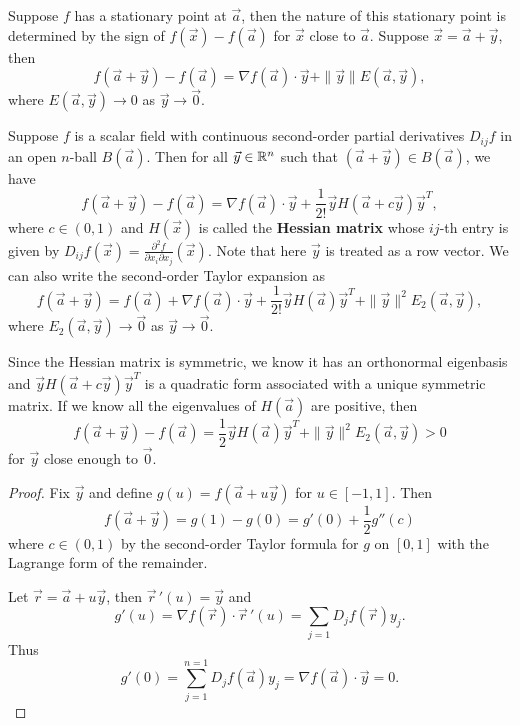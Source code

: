 \documentclass[a4paper]{ctexart}
\begin{document}
    \begin{myrmk}
        Suppose $f$ has a stationary point at $\vec a$, then the nature of this stationary point is determined by the sign of $f(\vec x) - f(\vec a)$ for $\vec x$ close to $\vec a$. Suppose $\vec x = \vec a + \vec y$, then
        $$ f(\vec a + \vec y) - f(\vec a) = \nabla f(\vec a) \cdot \vec y + \| \vec y\| E(\vec a, \vec y),$$
        where $E(\vec a, \vec y) \to 0$ as $\vec y \to \vec 0$.
    \end{myrmk}
    \begin{mythm}
        Suppose $f$ is a scalar field with continuous second-order partial derivatives $D_{ij} f$ in an open $n$-ball $B(\vec a)$. Then for all $\vec y \in \mathbb{R}^n$ such that $(\vec a + \vec y) \in B(\vec a)$, we have
        $$ 
        f(\vec a + \vec y) - f(\vec a ) = \nabla f(\vec a) \cdot \vec y + \frac{1}{2!} \vec y H(\vec a + c \vec y) \vec y^T,
        $$
        where $c\in (0,1)$ and $H(\vec x)$ is called the \textbf{Hessian matrix} whose $ij$-th entry is given by $D_{ij} f(\vec x) = \displaystyle \frac{\partial^2 f}{\partial x_i \partial x_j}(\vec x)$. Note that here $\vec y$ is treated as a row vector. We can also write the second-order Taylor expansion as
        $$
        f(\vec a + \vec y) = f(\vec a) + \nabla f(\vec a) \cdot \vec y + \frac{1}{2!} \vec y H(\vec a) \vec y^T + \| \vec y \|^2 E_2(\vec a, \vec y),
        $$
        where $E_2(\vec a, \vec y) \to \vec 0$ as $\vec y \to \vec 0$.
    \end{mythm}
    \begin{myrmk}
        Since the Hessian matrix is symmetric, we know it has an orthonormal eigenbasis and $\vec y H(\vec a + c \vec y) \vec y^T$ is a quadratic form associated with a unique symmetric matrix. If we know all the eigenvalues of $H(\vec a)$ are positive, then
        $$ f(\vec a + \vec y) - f(\vec a) = \frac{1}{2} \vec y H(\vec a) \vec y^T + \| \vec y\|^2 E_2(\vec a, \vec y) > 0 $$
        for $\vec y$ close enough to $\vec 0$.
    \end{myrmk}
    \begin{proof}
        Fix $\vec y$ and define $g(u) = f(\vec a + u\vec y)$ for $u \in [-1,1]$. Then
        $$ f(\vec a + \vec y ) = g(1) - g(0) = g'(0) + \frac{1}{2} g''(c)$$
        where $c\in (0,1)$ by the second-order Taylor formula for $g$ on $[0,1]$ with the Lagrange form of the remainder.

        Let $\vec r = \vec a + u \vec y$, then $\vec r\,'(u) = \vec y$ and
        $$ g'(u) = \nabla f(\vec r) \cdot \vec r\,'(u) = \sum_{j=1} D_j f(\vec r) y_j. $$
        Thus
        $$ g'(0) = \sum_{j=1}^{n=1} D_j f(\vec a) y_j = \nabla f(\vec a) \cdot \vec y = 0. $$

    \end{proof}
\end{document}

